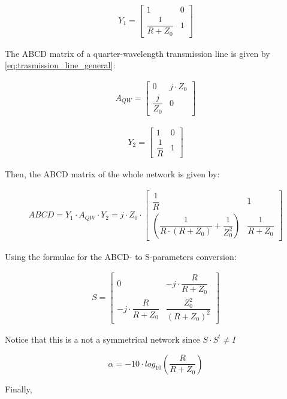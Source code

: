 \begin{gather}
 Y_{1} = 
 \begin{bmatrix} 1 & 0 \\ \dfrac{1}{R + Z_0} & 1 \end{bmatrix}
\end{gather}

\noindent The ABCD matrix of a quarter-wavelength transmission line is given by \ref{eq:trasmission_line_general}:

\begin{gather}
 A_{QW} = 
 \begin{bmatrix} 0 & j \cdot Z_0 \\ \dfrac{j}{Z_0} & 0 \end{bmatrix}
\end{gather}

\begin{gather}
 Y_{2} = 
 \begin{bmatrix} 1 & 0 \\ \dfrac{1}{R} & 1 \end{bmatrix}
\end{gather}

\noindent Then, the ABCD matrix of the whole network is given by:

\begin{gather}
 ABCD = Y_{1} \cdot A_{QW} \cdot Y_{2} = j \cdot Z_0 \cdot 
 \begin{bmatrix} \dfrac{1}{R} & 1 \\ \left( \dfrac{1}{R \cdot (R + Z_0)} + \dfrac{1}{Z_0^2}\right) & \dfrac{1}{R+Z_0} \end{bmatrix}
\end{gather}

\noindent Using the formulae for the ABCD- to S-parameters conversion:

\begin{gather}
 S = 
 \begin{bmatrix} 0 & -j\cdot \dfrac{R}{R+Z_0} \\ -j\cdot \dfrac{R}{R+Z_0} & \dfrac{Z_0^2}{(R+Z_0)^2} \end{bmatrix}
\end{gather}

\noindent Notice that this is a not a symmetrical network since $S \cdot S^t \neq I$

\begin{equation}
\alpha = -10 \cdot log_{10} \left( \dfrac{R}{R+Z_0}\right)
\end{equation}

\noindent Finally,

